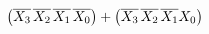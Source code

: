 \documentclass[preview]{standalone}
\begin{document}
\begin{align*}
\left(\overline{X_3}\hspace{0.05cm}\overline{X_2}\hspace{0.05cm}\overline{X_1}\hspace{0.05cm}\overline{X_0}\right)+\left(\overline{X_3}\hspace{0.05cm}\overline{X_2}\hspace{0.05cm}\overline{X_1}X_0\right)
\end{align*}
\end{document}
